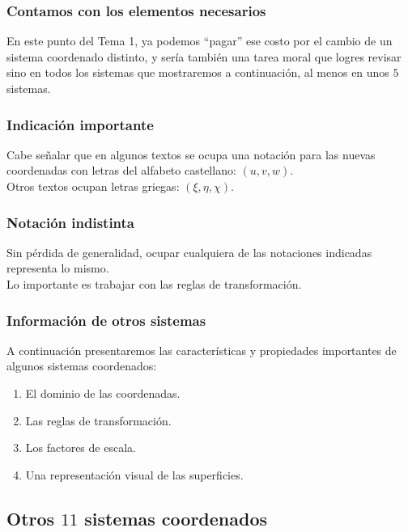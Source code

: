 \documentclass[12pt]{beamer}
\begin{document}
\begin{frame}
\frametitle{Contamos con los elementos necesarios}
En este punto del Tema 1, ya podemos \enquote{pagar} ese costo por el cambio de un sistema coordenado distinto, y sería también una tarea moral que logres revisar sino en todos los sistemas que mostraremos a continuación, al menos en unos $5$ sistemas.
\end{frame}
\begin{frame}
\frametitle{Indicación importante}
Cabe señalar que en algunos textos se ocupa una notación para las nuevas coordenadas con letras del alfabeto castellano: $(u, v ,w)$.
\\
\bigskip
\pause
Otros textos ocupan letras griegas: $(\xi, \eta, \chi)$.
\end{frame}
\begin{frame}
\frametitle{Notación indistinta}
Sin pérdida de generalidad, ocupar cualquiera de las notaciones indicadas representa lo mismo.
\\
\bigskip
\pause
Lo importante es trabajar con las reglas de transformación.
\end{frame}
\begin{frame}
\frametitle{Información de otros sistemas}
A continuación presentaremos las características y propiedades importantes de algunos sistemas coordenados:
\pause
{}
\begin{enumerate}[<+->]
\item El dominio de las coordenadas.
\item Las reglas de transformación. 
\item Los factores de escala.
\item Una representación visual de las superficies.
\end{enumerate}
\end{frame}

\subsection{Otros \texorpdfstring{$11$}{11} sistemas coordenados}

\end{document}
